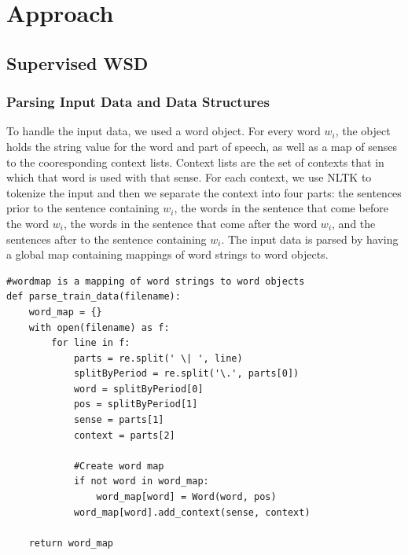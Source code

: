 \documentclass[11pt]{article}
\begin{document}
\setlength{\parindent}{0in}
\addtolength{\parskip}{0.1cm}
\setlength{\fboxrule}{.5mm}\setlength{\fboxsep}{1.2mm}
\newlength{\boxlength}\setlength{\boxlength}{\textwidth}
\addtolength{\boxlength}{-4mm}

\begin{center}
\end{center}

\section{Approach}
\subsection{Supervised WSD}
\subsubsection{Parsing Input Data and Data Structures}

To handle the input data, we used a word object. For every word $w_i$, the object holds the string value for the word and part of speech, as well as a map of senses to the cooresponding context lists. Context lists are the set of contexts that in which that word is used with that sense. For each context, we use NLTK to tokenize the input and then we separate the context into four parts: the sentences prior to the sentence containing $w_i$, the words in the sentence that come before the word $w_i$, the words in the sentence that come after the word $w_i$, and the sentences after to the sentence containing $w_i$. The input data is parsed by having a global map containing mappings of word strings to word objects. 

\begin{lstlisting}
#wordmap is a mapping of word strings to word objects
def parse_train_data(filename):
    word_map = {}
    with open(filename) as f:
        for line in f:
            parts = re.split(' \| ', line)
            splitByPeriod = re.split('\.', parts[0])
            word = splitByPeriod[0]
            pos = splitByPeriod[1]
            sense = parts[1]
            context = parts[2]

            #Create word map
            if not word in word_map:
                word_map[word] = Word(word, pos)
            word_map[word].add_context(sense, context)

    return word_map
\end{lstlisting}
\end{document}

